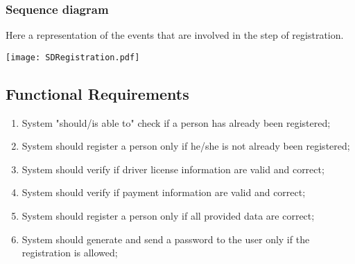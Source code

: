 \documentclass{scrreprt}
\begin{document}
\subsubsection{Sequence diagram}
Here a representation of the events that are involved in the step of registration.
\begin{center}
\texttt{[image: SDRegistration.pdf]}
\end{center}

\begin{comment}$<$List the sequences of user actions and system responses that stimulate the 
behavior defined for this feature. These will correspond to the dialog elements 
associated with use cases.$>$
\end{comment}

\subsection{Functional Requirements}

\begin{enumerate}[label=R\arabic*., start=1]
\item System "should/is able to" check if a person has already been registered;
\item System should register a person only if he/she is not already been registered;
\item System should verify if driver license information are valid and correct;
\item System should verify if payment information are valid and correct;
\item System should register a person only if all provided data are correct;
\item System should generate and send a password to the user only if the registration is allowed;
\end{enumerate}

\begin{comment}$<$Itemize the detailed functional requirements associated with this feature.  
These are the software capabilities that must be present in order for the user 
to carry out the services provided by the feature, or to execute the use case.  
Include how the product should respond to anticipated error conditions or 
invalid inputs. Requirements should be concise, complete, unambiguous, 
verifiable, and necessary. Use “TBD” as a placeholder to indicate when necessary 
information is not yet available.$>$
\end{comment}
\end{document}
